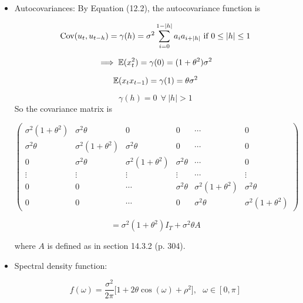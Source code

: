 \begin{itemize}

\item Autocovariances: By Equation (12.2), the autocovariance function is

\[
\mathrm{Cov}(u_t, u_{t-h})  = \gamma(h) = \sigma^2 \sum_{i=0}^{1 - |h|} a_i a_{i + |h|} \text{ if } 0 \leq |h| \leq 1
\]

\[
\implies \mathbb{E}(x_t^2) = \gamma(0) = (1 + \theta^2)\sigma^2
\]

\[
 \mathbb{E}(x_t x_{t-1}) =  \gamma(1) = \theta \sigma^2
\]

\[
\gamma(h) = 0 \ \ \forall \ |h| > 1
\]
So the covariance matrix is

\[
\begin{pmatrix} 
\sigma^2(1+\theta^2) & \sigma^2\theta & 0 & 0 & \cdots & 0 \\
\sigma^2\theta & \sigma^2(1+\theta^2) & \sigma^2\theta & 0 & \cdots & 0 \\
0 & \sigma^2\theta & \sigma^2(1+\theta^2) & \sigma^2\theta & \cdots & 0 \\
\vdots & \vdots & \vdots & \vdots & \cdots & \vdots \\
 0 & 0& \cdots & \sigma^2\theta  & \sigma^2(1+\theta^2)   & \sigma^2\theta  \\
0 & 0 &  \cdots & 0  & \sigma^2\theta  & \sigma^2(1+\theta^2) 
\end{pmatrix} 
\]

\[
= \sigma^2(1 + \theta^2)I_T + \sigma^2 \theta A
\]

where \(A\) is defined as in section 14.3.2 (p. 304).

\item Spectral density function:

\[
f(\omega) = \frac{\sigma^2}{2\pi} \big[ 1+ 2  \theta \cos( \omega)  + \rho^2  \big] , \ \ \ \omega \in [0, \pi]
 \]

\end{itemize}



%
%
%


